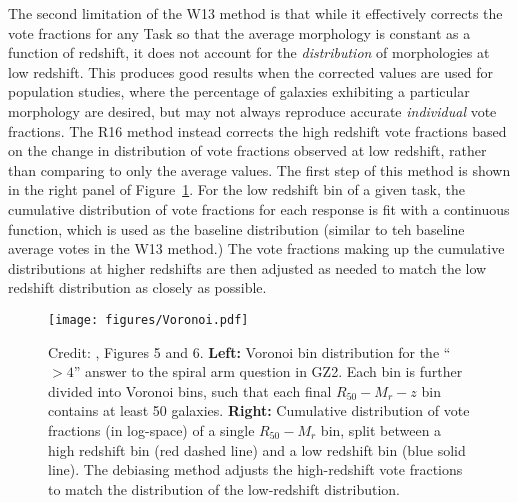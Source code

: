The second limitation of the W13 method is that while it effectively corrects the vote fractions for any Task so that the average morphology is constant as a function of redshift, it does not account for the \emph{distribution} of morphologies at low redshift. This produces good results when the corrected values are used for population studies, where the percentage of galaxies exhibiting a particular morphology are desired, but may not always reproduce accurate \emph{individual} vote fractions. The R16 method instead corrects the high redshift vote fractions based on the change in distribution of vote fractions observed at low redshift, rather than comparing to only the average values. The first step of this method is shown in the right panel of Figure~\ref{fig:voronoi}. For the low redshift bin of a given task, the cumulative distribution of vote fractions for each response is fit with a continuous function, which is used as the baseline distribution (similar to teh baseline average votes in the W13 method.) The vote fractions making up the cumulative distributions at higher redshifts are then adjusted as needed to match the low redshift distribution as closely as possible.


\begin{figure}
\centering
\texttt{[image: figures/Voronoi.pdf]}
\caption{Credit: \citet{Hart2016}, Figures 5 and 6. \textbf{Left:} Voronoi bin distribution for the ``$>4$'' answer to the spiral arm question in GZ2. Each bin is further divided into Voronoi bins, such that each final $R_{50}-M_{r}-z$ bin contains at least 50 galaxies. \textbf{Right:} Cumulative distribution of vote fractions (in log-space) of a single $R_{50}-M_{r}$ bin, split between a high redshift bin (red dashed line) and a low redshift bin (blue solid line). The debiasing method adjusts the high-redshift vote fractions to match the distribution of the low-redshift distribution. }
\label{fig:voronoi}
\end{figure}

